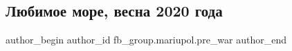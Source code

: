  
 
 
 
 

\subsection{Любимое море, весна 2020 года}
\label{sec:11_02_2023.fb.fb_group.mariupol.pre_war.10.lyubimoe_more__vesna}

\ifcmt
 author_begin
   author_id fb_group.mariupol.pre_war
 author_end
\fi
